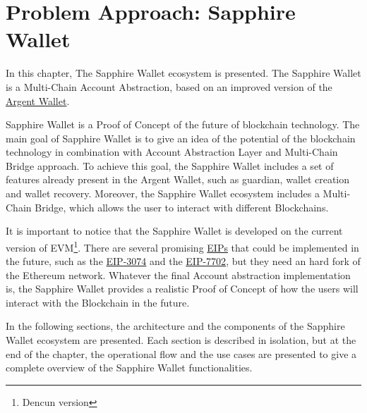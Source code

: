\chapter{Problem Approach: Sapphire Wallet}
\label{chap:problem_approach}

In this chapter, The Sapphire Wallet ecosystem is presented. The Sapphire Wallet is a Multi-Chain Account Abstraction, based on an improved version of the \hyperref[subsec:argent]{Argent Wallet}.

Sapphire Wallet is a Proof of Concept of the future of blockchain technology. The main goal of Sapphire Wallet is to give an idea of the potential of the blockchain technology in combination with Account Abstraction Layer and Multi-Chain Bridge approach. To achieve this goal, the Sapphire Wallet includes a set of features already present in the Argent Wallet, such as guardian, wallet creation and wallet recovery. Moreover, the Sapphire Wallet ecosystem includes a Multi-Chain Bridge, which allows the user to interact with different Blockchains. 

It is important to notice that the Sapphire Wallet is developed on the current version of EVM\footnote{Dencun version}. There are several promising \hyperref[subsec:eips]{EIPs} that could be implemented in the future, such as the \hyperref[subsubsec:eip-3074]{EIP-3074} and the \hyperref[subsubsec:erc-7702]{EIP-7702}, but they need an hard fork of the Ethereum network. Whatever the final Account abstraction implementation is, the Sapphire Wallet provides a realistic Proof of Concept of how the users will interact with the Blockchain in the future.

In the following sections, the architecture and the components of the Sapphire Wallet ecosystem are presented. Each section is described in isolation, but at the end of the chapter, the operational flow and the use cases are presented to give a complete overview of the Sapphire Wallet functionalities.







